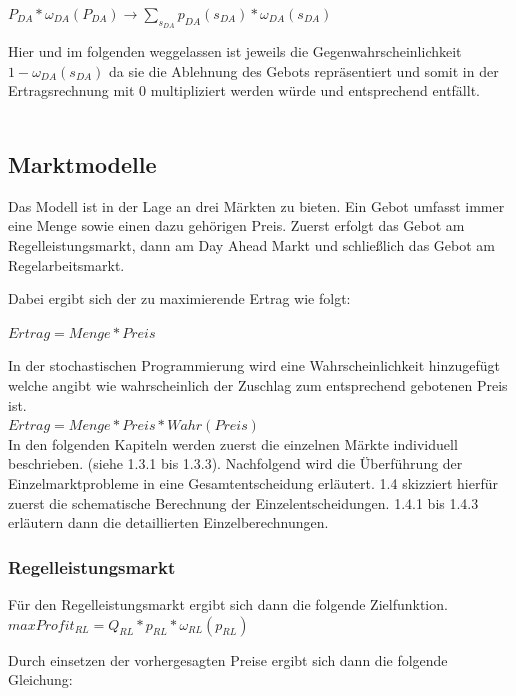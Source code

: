 \documentclass{article}
\begin{document}
$P_{DA} * \omega_{DA}(P_{DA}) \rightarrow \sum_{s_{DA}} p_{DA}(s_{DA}) * \omega_{DA}(s_{DA})$\\


 Hier und im folgenden weggelassen ist jeweils die Gegenwahrscheinlichkeit $1-\omega_{DA}(s_{DA})$ da sie die Ablehnung des Gebots repräsentiert und somit in der Ertragsrechnung mit 0 multipliziert werden würde und entsprechend entfällt.\\
\\

\subsection{Marktmodelle}

Das Modell ist in der Lage an drei Märkten zu bieten. Ein Gebot umfasst immer eine Menge sowie einen dazu gehörigen Preis. Zuerst erfolgt das Gebot am Regelleistungsmarkt, dann am Day Ahead Markt und schließlich das Gebot am Regelarbeitsmarkt.

Dabei ergibt sich der zu maximierende Ertrag wie folgt:

$Ertrag = Menge * Preis$

In der stochastischen Programmierung wird eine Wahrscheinlichkeit hinzugefügt welche angibt wie wahrscheinlich der Zuschlag zum entsprechend gebotenen Preis ist.\\

$Ertrag = Menge * Preis * Wahr(Preis)$\\

In den folgenden Kapiteln werden zuerst die einzelnen Märkte  individuell beschrieben. (siehe 1.3.1 bis 1.3.3).
Nachfolgend wird die Überführung der Einzelmarktprobleme in eine Gesamtentscheidung erläutert.
1.4 skizziert hierfür zuerst die schematische Berechnung der Einzelentscheidungen.
1.4.1 bis 1.4.3 erläutern dann die detaillierten Einzelberechnungen.

\subsubsection{Regelleistungsmarkt}
Für den Regelleistungsmarkt ergibt sich dann die folgende Zielfunktion.\\

$max Profit_{RL} = Q_{RL} * p_{RL} * \omega_{RL}(p_{RL})$

Durch einsetzen der vorhergesagten Preise ergibt sich dann die folgende Gleichung:\\
\end{document}
